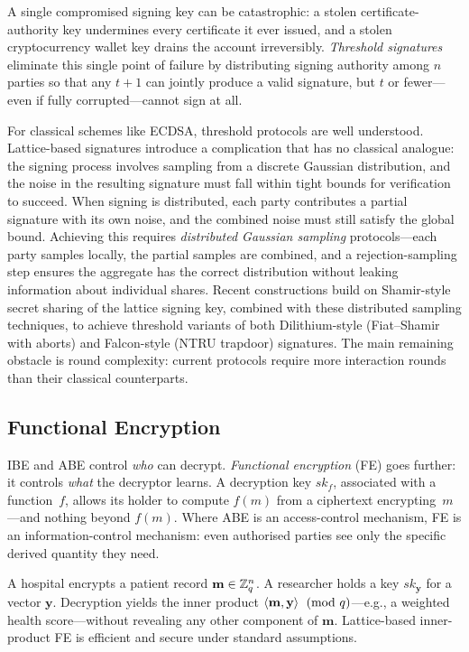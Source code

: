 A single compromised signing key can be catastrophic: a stolen certificate-authority key undermines every certificate it ever issued, and a stolen cryptocurrency wallet key drains the account irreversibly.  \emph{Threshold signatures} eliminate this single point of failure by distributing signing authority among $n$ parties so that any $t+1$ can jointly produce a valid signature, but $t$ or fewer---even if fully corrupted---cannot sign at all.

For classical schemes like ECDSA, threshold protocols are well understood.  Lattice-based signatures introduce a complication that has no classical analogue: the signing process involves sampling from a discrete Gaussian distribution, and the noise in the resulting signature must fall within tight bounds for verification to succeed.  When signing is distributed, each party contributes a partial signature with its own noise, and the combined noise must still satisfy the global bound.  Achieving this requires \emph{distributed Gaussian sampling} protocols---each party samples locally, the partial samples are combined, and a rejection-sampling step ensures the aggregate has the correct distribution without leaking information about individual shares.  Recent constructions build on Shamir-style secret sharing of the lattice signing key, combined with these distributed sampling techniques, to achieve threshold variants of both Dilithium-style (Fiat--Shamir with aborts) and Falcon-style (NTRU trapdoor) signatures.  The main remaining obstacle is round complexity: current protocols require more interaction rounds than their classical counterparts.


\subsection{Functional Encryption}
\label{subsec:fe}

IBE and ABE control \emph{who} can decrypt.  \emph{Functional encryption} (FE) goes further: it controls \emph{what} the decryptor learns.  A decryption key $\mathit{sk}_f$, associated with a function~$f$, allows its holder to compute $f(m)$ from a ciphertext encrypting~$m$---and nothing beyond $f(m)$.  Where ABE is an access-control mechanism, FE is an information-control mechanism: even authorised parties see only the specific derived quantity they need.

\begin{example}
\label{ex:ipfe}
A hospital encrypts a patient record $\mathbf{m} \in \mathbb{Z}_q^n$.  A researcher holds a key $\mathit{sk}_{\mathbf{y}}$ for a vector $\mathbf{y}$.  Decryption yields the inner product $\left\langle \mathbf{m}, \mathbf{y} \right\rangle \pmod{q}$---e.g., a weighted health score---without revealing any other component of $\mathbf{m}$.  Lattice-based inner-product FE is efficient and secure under standard \lwe{} assumptions.
\end{example}

